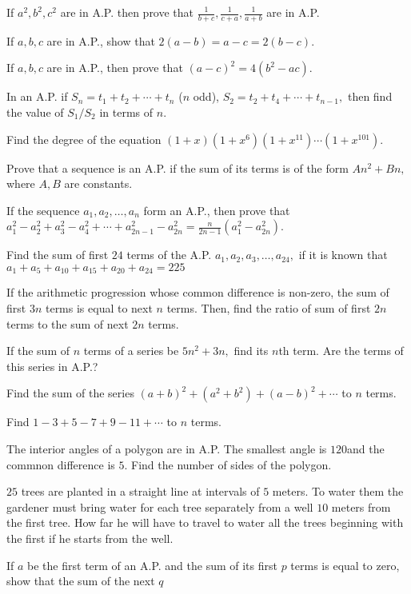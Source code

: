 \item If $a^2, b^2, c^2$ are in A.P. then prove that $\frac{1}{b+c}, \frac{1}{c+a}, \frac{1}{a + b}$ are in A.P.
\item If $a, b, c$ are in A.P., show that $2(a - b) = a - c = 2(b - c)$.
\item If $a, b , c$ are in A.P., then prove that $(a - c)^2 = 4(b^2 - ac)$.
\item In an A.P. if $S_n = t_1 + t_2 + \cdots + t_n$ ($n$ odd), $S_2 = t_2 + t_4 + \cdots + t_{n - 1},$ then find the value of
  $S_1/S_2$ in terms of $n$.
\item Find the degree of the equation $(1 + x)(1 + x^6)(1 + x^{11})\cdots (1+ x^{101})$.
\item Prove that a sequence is an A.P. if the sum of its terms is of the form $An^2 + Bn,$ where $A, B$ are constants.
\item If the sequence $a_1, a_2, \ldots, a_n$ form an A.P., then prove that $a_1^2 - a_2^2 + a_3^2 - a_4^2 + \cdots + a_{2n - 1}^2
  - a_{2n}^2 = \frac{n}{2n - 1}(a_1^2 - a_{2n}^2)$.
\item Find the sum of first $24$ terms of the A.P. $a_1, a_2, a_3, \ldots, a_{24},$ if it is known that $a_1 + a_5 + a_{10} +
  a_{15} + a_{20} + a_{24} = 225$
\item If the arithmetic progression whose common difference is non-zero, the sum of first $3n$ terms is equal to next $n$
  terms. Then, find the ratio of sum of first $2n$ terms to the sum of next $2n$ terms.
\item If the sum of $n$ terms of a series be $5n^2 + 3n,$ find its $n$th term. Are the terms of this series in A.P.?
\item Find the sum of the series $(a + b)^2 + (a^2 + b^2) + (a - b)^2 + \cdots$ to $n$ terms.
\item Find $1 - 3 + 5 - 7 + 9 - 11 + \cdots$ to $n$ terms.
\item The interior angles of a polygon are in A.P. The smallest angle is $120$\textdegree and the commnon difference is
  $5$\textdegree. Find the number of sides of the polygon.
\item $25$ trees are planted in a straight line at intervals of $5$ meters. To water them the gardener must bring water for each
  tree separately from a well $10$ meters from the first tree. How far he will have to travel to water all the trees beginning with
  the first if he starts from the well.
\item If $a$ be the first term of an A.P. and the sum of its first $p$ terms is equal to zero, show that the sum of the next $q$
